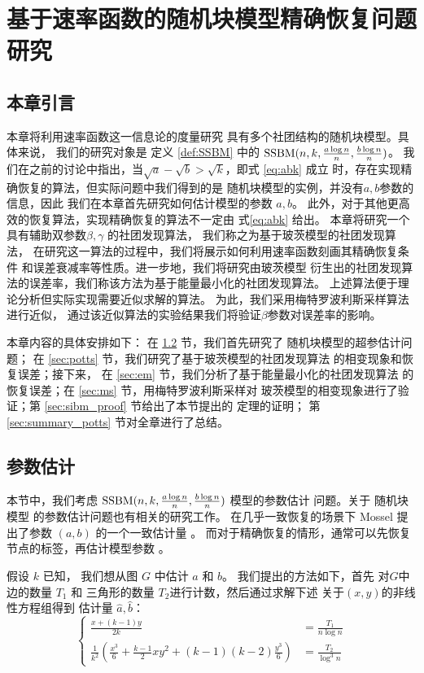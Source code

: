 
\chapter{基于速率函数的随机块模型精确恢复问题研究}\label{chap:sibm}
\section{本章引言}
本章将利用速率函数这一信息论的度量研究
具有多个社团结构的随机块模型。具体来说，
我们的研究对象是
定义 \ref{def:SSBM} 中的 $\operatorname{SSBM}(n,k,\frac{a \log n}{n}, \frac{b \log n}{n})$。
我们在之前的讨论中指出，当$\sqrt{a}-\sqrt{b}>\sqrt{k}$，即式 \eqref{eq:abk} 成立
时，存在实现精确恢复的算法，但实际问题中我们得到的是
随机块模型的实例，并没有$a,b$参数的信息，因此
我们在本章首先研究如何估计模型的参数 $a,b$。
此外，对于其他更高效的恢复算法，实现精确恢复的算法不一定由 式\eqref{eq:abk}
给出。
本章将研究一个具有辅助双参数$\beta,\gamma$ 的社团发现算法，
我们称之为基于玻茨模型的社团发现算法，
在研究这一算法的过程中，我们将展示如何利用速率函数刻画其精确恢复条件
和误差衰减率等性质。进一步地，我们将研究由玻茨模型
衍生出的社团发现算法的误差率，我们称该方法为基于能量最小化的社团发现算法。
上述算法便于理论分析但实际实现需要近似求解的算法。
为此，我们采用梅特罗波利斯采样算法进行近似，
通过该近似算法的实验结果我们将验证$\beta$参数对误差率的影响。

本章内容的具体安排如下：
在 \ref{sec:parameter_estimation} 节，我们首先研究了
随机块模型的超参估计问题；
在 \ref{sec:potts} 节，我们研究了基于玻茨模型的社团发现算法
的相变现象和恢复误差；接下来，
在 \ref{sec:em} 节，我们分析了基于能量最小化的社团发现算法
的恢复误差；在 \ref{sec:ms} 节，用梅特罗波利斯采样对
玻茨模型的相变现象进行了验证；第 \ref{sec:sibm_proof} 节给出了本节提出的
定理的证明；
第 \ref{sec:summary_potts} 节对全章进行了总结。
\section{参数估计}\label{sec:parameter_estimation}


本节中，我们考虑 $\operatorname{SSBM}(n,k,\frac{a \log n}{n}, \frac{b \log n}{n})$ 模型的参数估计
问题。关于 随机块模型 的参数估计问题也有相关的研究工作。
在几乎一致恢复的场景下 Mossel 提出了参数 $(a,b)$ 的一个一致估计量
\cite{mossel2015reconstruction}。
而对于精确恢复的情形，通常可以先恢复节点的标签，再估计模型参数
\cite{abbe2015recovering}。

假设 $k$ 已知，
我们想从图 $G$ 中估计
$a$ 和 $b$。
我们提出的方法如下，首先
对$G$中 边的数量 $T_1$ 
和 三角形的数量
$T_2$进行计数，然后通过求解下述
关于$(x,y)$的非线性方程组得到
估计量 $\hat{a}, \hat{b}$：
\begin{equation} \label{eq:e_1}
\left\{
	\begin{alignedat}{1}
	\frac{x+(k-1)y}{2k}  &= \frac{T_1}{n\log n} \\
\frac{1}{k^2}
\left(\frac{x^3}{6} + \frac{k-1}{2}xy^2 + (k-1)(k-2)\frac{y^3}{6}\right)
 &= \frac{T_2}{\log^3 n}
	\end{alignedat}
\right.
\end{equation}


